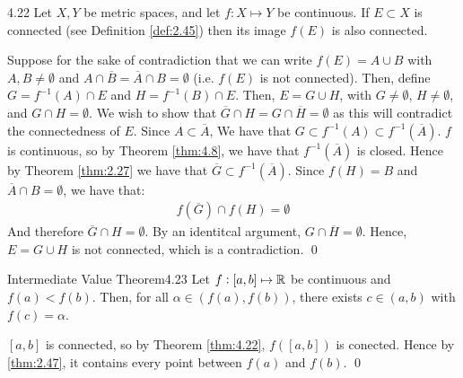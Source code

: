 \setcounter{rudin}{21}
\begin{theorem}{}{4.22}
    Let $X, Y$ be metric spaces, and let $f: X \mapsto Y$ be continuous. If $E \subset X$ is connected (see Definition \ref{def:2.45}) then its image $f(E)$ is also connected.
\end{theorem}
\begin{nproof}
    Suppose for the sake of contradiction that we can write $f(E) = A \cup B$ with $A, B \neq \emptyset$ and $A \cap \overline{B} = \overline{A} \cap B = \emptyset$ (i.e. $f(E)$ is not connected). Then, define $G = f^{-1}(A) \cap E$ and $H = f^{-1}(B) \cap E$. Then, $E = G \cup H$, with $G \neq \emptyset$, $H \neq \emptyset$, and $G \cap H = \emptyset$. We wish to show that $\overline{G} \cap H = G \cap \overline{H} = \emptyset$ as this will contradict the connectedness of $E$. Since $A \subset \overline{A}$, We have that $G \subset f^{-1}(A) \subset f^{-1}(\overline{A})$. $f$ is continuous, so by Theorem \ref{thm:4.8}, we have that $f^{-1}(\overline{A})$ is closed. Hence by Theorem \ref{thm:2.27} we have that $\overline{G} \subset f^{-1}(\overline{A})$. Since $f(H) = B$ and $\overline{A} \cap B = \emptyset$, we have that:
    \begin{align*}
        f(\overline{G}) \cap f(H) = \emptyset
    \end{align*}
    And therefore $\overline{G} \cap H = \emptyset$. By an identitcal argument, $G \cap \overline{H} = \emptyset$. Hence, $E = G \cup H$ is not connected, which is a contradiction. \qed
\end{nproof}

\begin{theorem}{Intermediate Value Theorem}{4.23}
    Let $f: [a, b] \mapsto \mathbb{R}$ be continuous and $f(a) < f(b)$. Then, for all $\alpha \in (f(a), f(b))$, there exists $c \in (a, b)$ with $f(c) = \alpha$.
\end{theorem}
\begin{nproof}
    $[a, b]$ is connected, so by Theorem \ref{thm:4.22}, $f([a, b])$ is conected. Hence by \ref{thm:2.47}, it contains every point between $f(a)$ and $f(b)$. \qed
\end{nproof}

